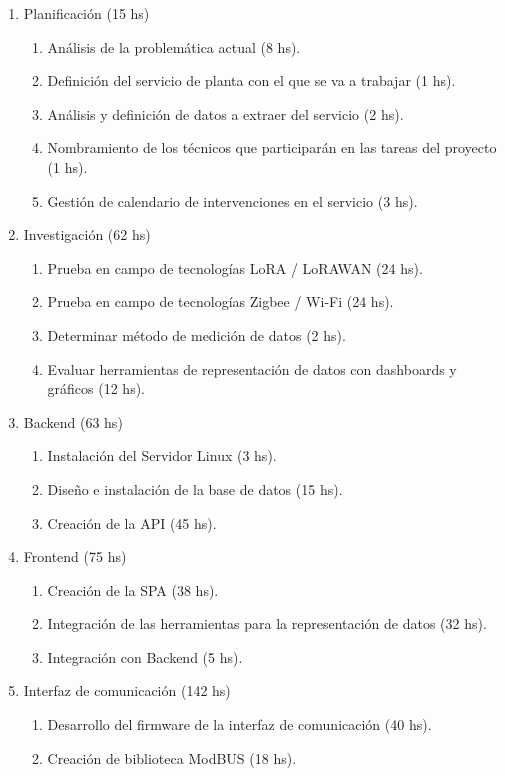 \documentclass[
11pt%
]{charter}
\begin{document}
\begin{enumerate}
\item Planificación (15 hs)
	\begin{enumerate}
	\item Análisis de la problemática actual (8 hs).
	\item Definición del servicio de planta con el que se va a trabajar (1 hs).
	\item Análisis y definición de datos a extraer del servicio (2 hs).
	\item Nombramiento de los técnicos que participarán en las tareas del proyecto (1 hs).
	\item Gestión de calendario de intervenciones en el servicio (3 hs).
	\end{enumerate}
\item Investigación (62 hs)
	\begin{enumerate}
	\item Prueba en campo de tecnologías LoRA / LoRAWAN (24 hs).
	\item Prueba en campo de tecnologías Zigbee / Wi-Fi (24 hs).
	\item Determinar método de medición de datos (2 hs).
	\item Evaluar herramientas de representación de datos con dashboards y gráficos (12 hs).
	\end{enumerate}
\item Backend (63 hs)
	\begin{enumerate}
	\item Instalación del Servidor Linux (3 hs).
	\item Diseño e instalación de la base de datos (15 hs).
	\item Creación de la API (45 hs).
	\end{enumerate}
\item Frontend (75 hs)
	\begin{enumerate}
	\item Creación de la SPA (38 hs).
	\item Integración de las herramientas para la representación de datos (32 hs).
	\item Integración con Backend (5 hs).
	\end{enumerate}
\item Interfaz de comunicación (142 hs)
	\begin{enumerate}
	\item Desarrollo del firmware de la interfaz de comunicación (40 hs).
	\item Creación de biblioteca ModBUS (18 hs).

\end{enumerate}
\end{enumerate}
\end{document}
